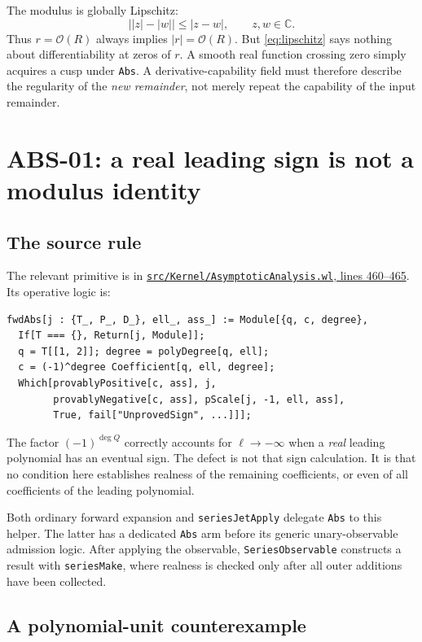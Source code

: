 \documentclass[11pt,a4paper]{article}
\newcommand{\code}[1]{\nolinkurl{#1}}
\newcommand{\OO}{\mathcal O}
\newcommand{\CC}{\mathbb C}
\newcommand{\src}[3]{\href{https://github.com/VladimirReshetnikov/Asymptotic/blob/651f2029d0b2cd4da9e4dfdf1f4275a124d23b99/#1\#L#2-L#3}{\code{#1}, lines #2--#3}}
\begin{document}
The modulus is globally Lipschitz:
\begin{equation}\label{eq:lipschitz}
 \bigl||z|-|w|\bigr|\leq |z-w|,\qquad z,w\in\CC.
\end{equation}
Thus $r=\OO(R)$ always implies $|r|=\OO(R)$. But \eqref{eq:lipschitz} says nothing about differentiability at zeros of $r$. A smooth real function crossing zero simply acquires a cusp under \code{Abs}. A derivative-capability field must therefore describe the regularity of the \emph{new remainder}, not merely repeat the capability of the input remainder.

\section{ABS-01: a real leading sign is not a modulus identity}
\subsection{The source rule}

The relevant primitive is in \src{src/Kernel/AsymptoticAnalysis.wl}{460}{465}. Its operative logic is:
\begin{lstlisting}
fwdAbs[j : {T_, P_, D_}, ell_, ass_] := Module[{q, c, degree},
  If[T === {}, Return[j, Module]];
  q = T[[1, 2]]; degree = polyDegree[q, ell];
  c = (-1)^degree Coefficient[q, ell, degree];
  Which[provablyPositive[c, ass], j,
        provablyNegative[c, ass], pScale[j, -1, ell, ass],
        True, fail["UnprovedSign", ...]]];
\end{lstlisting}
The factor $(-1)^{\deg Q}$ correctly accounts for $\ell\to-\infty$ when a \emph{real} leading polynomial has an eventual sign. The defect is not that sign calculation. It is that no condition here establishes realness of the remaining coefficients, or even of all coefficients of the leading polynomial.

Both ordinary forward expansion and \code{seriesJetApply} delegate \code{Abs} to this helper. The latter has a dedicated \code{Abs} arm before its generic unary-observable admission logic. After applying the observable, \code{SeriesObservable} constructs a result with \code{seriesMake}, where realness is checked only after all outer additions have been collected.\cite{core,operations}

\subsection{A polynomial-unit counterexample}
\end{document}
